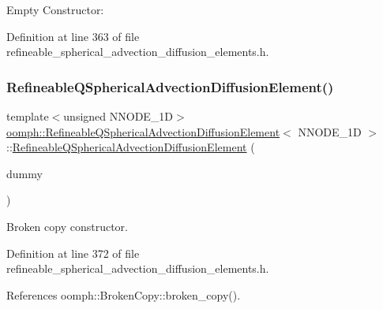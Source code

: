 Empty Constructor\+: 



Definition at line 363 of file refineable\+\_\+spherical\+\_\+advection\+\_\+diffusion\+\_\+elements.\+h.

\mbox{\label{classoomph_1_1RefineableQSphericalAdvectionDiffusionElement_aa3610c702ea9f0634f577dc0471ff18e}} 
\subsubsection{\texorpdfstring{Refineable\+Q\+Spherical\+Advection\+Diffusion\+Element()}{RefineableQSphericalAdvectionDiffusionElement()}\hspace{0.1cm}{\footnotesize\ttfamily [2/2]}}
{\footnotesize\ttfamily template$<$unsigned N\+N\+O\+D\+E\+\_\+1D$>$ \\
\hyperlink{classoomph_1_1RefineableQSphericalAdvectionDiffusionElement}{oomph\+::\+Refineable\+Q\+Spherical\+Advection\+Diffusion\+Element}$<$ N\+N\+O\+D\+E\+\_\+1D $>$\+::\hyperlink{classoomph_1_1RefineableQSphericalAdvectionDiffusionElement}{Refineable\+Q\+Spherical\+Advection\+Diffusion\+Element} (\begin{DoxyParamCaption}\item[{const \hyperlink{classoomph_1_1RefineableQSphericalAdvectionDiffusionElement}{Refineable\+Q\+Spherical\+Advection\+Diffusion\+Element}$<$ N\+N\+O\+D\+E\+\_\+1D $>$ \&}]{dummy }\end{DoxyParamCaption})\hspace{0.3cm}{\ttfamily [inline]}}



Broken copy constructor. 



Definition at line 372 of file refineable\+\_\+spherical\+\_\+advection\+\_\+diffusion\+\_\+elements.\+h.



References oomph\+::\+Broken\+Copy\+::broken\+\_\+copy().



